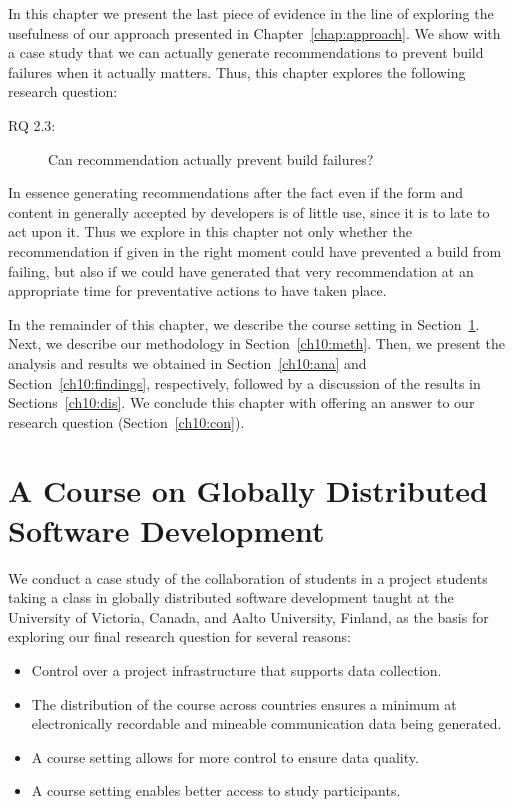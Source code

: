 \label{chap:actionable}
In this chapter we present the last piece of evidence in the line of exploring the usefulness of our approach presented in Chapter~\ref{chap:approach}.
We show with a case study that we can actually generate recommendations to prevent build failures when it actually matters.
Thus, this chapter explores the following research question:

\begin{description}
  \item[RQ 2.3:] Can recommendation actually prevent build failures?
\end{description}

In essence generating recommendations after the fact even if the form and content in generally accepted by developers is of little use, since it is to late to act upon it.
Thus we explore in this chapter not only whether the recommendation if given in the right moment could have prevented a build from failing, but also if we could have generated that very recommendation at an appropriate time for preventative actions to have taken place.

In the remainder of this chapter, %
we describe the course setting in Section~\ref{ch10:setting}.
Next, we describe our methodology in Section~\ref{ch10:meth}.
Then, we present the analysis and results we obtained in Section~\ref{ch10:ana} and Section~\ref{ch10:findings}, respectively, followed by a discussion of the results in Sections~\ref{ch10:dis}.
We conclude this chapter with offering an answer to our research question (Section~\ref{ch10:con}).


\section{A Course on Globally Distributed Software Development}
\label{ch10:setting}
We conduct a case study of the collaboration of students in a project students taking a class in globally distributed software development taught at the University of Victoria, Canada, and Aalto University, Finland, as the basis for exploring our final research question for several reasons:
\begin{itemize}
\item Control over a project infrastructure that supports data collection.
\item The distribution of the course across countries ensures a minimum at electronically recordable and mineable communication data being generated.
\item A course setting allows for more control to ensure data quality.
\item A course setting enables better access to study participants.
\end{itemize}

